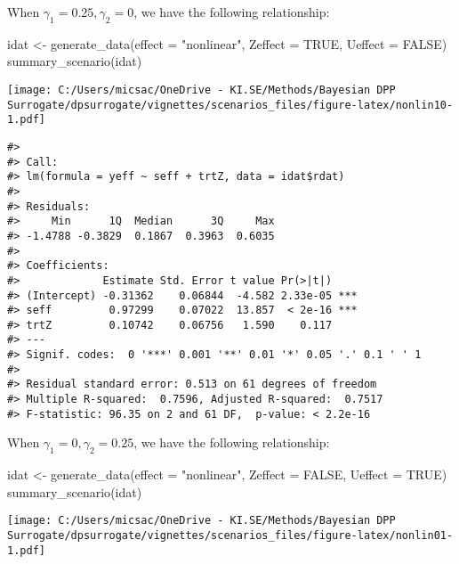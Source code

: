 \documentclass[
]{article}
\newenvironment{Shaded}{\begin{snugshade}}{\end{snugshade}}
\newcommand{\AttributeTok}[1]{\textcolor[rgb]{0.77,0.63,0.00}{#1}}
\newcommand{\ConstantTok}[1]{\textcolor[rgb]{0.00,0.00,0.00}{#1}}
\newcommand{\FunctionTok}[1]{\textcolor[rgb]{0.00,0.00,0.00}{#1}}
\newcommand{\NormalTok}[1]{#1}
\newcommand{\OtherTok}[1]{\textcolor[rgb]{0.56,0.35,0.01}{#1}}
\newcommand{\StringTok}[1]{\textcolor[rgb]{0.31,0.60,0.02}{#1}}
\begin{document}
When \(\gamma_1 = 0.25, \gamma_2 = 0\), we have the following
relationship:

\begin{Shaded}
\begin{Highlighting}[]
\NormalTok{idat }\OtherTok{\textless{}{-}} \FunctionTok{generate\_data}\NormalTok{(}\AttributeTok{effect =} \StringTok{"nonlinear"}\NormalTok{, }\AttributeTok{Zeffect =} \ConstantTok{TRUE}\NormalTok{, }\AttributeTok{Ueffect =} \ConstantTok{FALSE}\NormalTok{)}
\FunctionTok{summary\_scenario}\NormalTok{(idat)}
\end{Highlighting}
\end{Shaded}

\texttt{[image: C:/Users/micsac/OneDrive - KI.SE/Methods/Bayesian DPP Surrogate/dpsurrogate/vignettes/scenarios\_files/figure-latex/nonlin10-1.pdf]}

\begin{verbatim}
#> 
#> Call:
#> lm(formula = yeff ~ seff + trtZ, data = idat$rdat)
#> 
#> Residuals:
#>     Min      1Q  Median      3Q     Max 
#> -1.4788 -0.3829  0.1867  0.3963  0.6035 
#> 
#> Coefficients:
#>             Estimate Std. Error t value Pr(>|t|)    
#> (Intercept) -0.31362    0.06844  -4.582 2.33e-05 ***
#> seff         0.97299    0.07022  13.857  < 2e-16 ***
#> trtZ         0.10742    0.06756   1.590    0.117    
#> ---
#> Signif. codes:  0 '***' 0.001 '**' 0.01 '*' 0.05 '.' 0.1 ' ' 1
#> 
#> Residual standard error: 0.513 on 61 degrees of freedom
#> Multiple R-squared:  0.7596, Adjusted R-squared:  0.7517 
#> F-statistic: 96.35 on 2 and 61 DF,  p-value: < 2.2e-16
\end{verbatim}

When \(\gamma_1 = 0, \gamma_2 = 0.25\), we have the following
relationship:

\begin{Shaded}
\begin{Highlighting}[]
\NormalTok{idat }\OtherTok{\textless{}{-}} \FunctionTok{generate\_data}\NormalTok{(}\AttributeTok{effect =} \StringTok{"nonlinear"}\NormalTok{, }\AttributeTok{Zeffect =} \ConstantTok{FALSE}\NormalTok{, }\AttributeTok{Ueffect =} \ConstantTok{TRUE}\NormalTok{)}
\FunctionTok{summary\_scenario}\NormalTok{(idat)}
\end{Highlighting}
\end{Shaded}

\texttt{[image: C:/Users/micsac/OneDrive - KI.SE/Methods/Bayesian DPP Surrogate/dpsurrogate/vignettes/scenarios\_files/figure-latex/nonlin01-1.pdf]}
\end{document}
